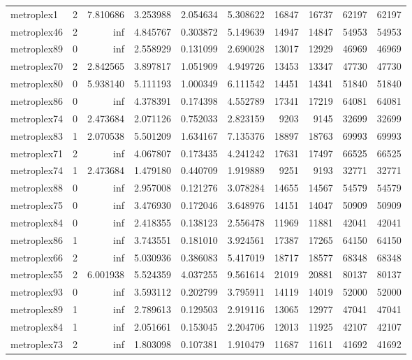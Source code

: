 \begin{longtable}{|l|r|r|r|r|r|r|r|r|r|}
metroplex1 & 2 & 7.810686 & 3.253988 & 2.054634 & 5.308622 & 16847 & 16737 & 62197 & 62197 \\
metroplex46 & 2 & inf & 4.845767 & 0.303872 & 5.149639 & 14947 & 14847 & 54953 & 54953 \\
metroplex89 & 0 & inf & 2.558929 & 0.131099 & 2.690028 & 13017 & 12929 & 46969 & 46969 \\
metroplex70 & 2 & 2.842565 & 3.897817 & 1.051909 & 4.949726 & 13453 & 13347 & 47730 & 47730 \\
metroplex80 & 0 & 5.938140 & 5.111193 & 1.000349 & 6.111542 & 14451 & 14341 & 51840 & 51840 \\
metroplex86 & 0 & inf & 4.378391 & 0.174398 & 4.552789 & 17341 & 17219 & 64081 & 64081 \\
metroplex74 & 0 & 2.473684 & 2.071126 & 0.752033 & 2.823159 & 9203 & 9145 & 32699 & 32699 \\
metroplex83 & 1 & 2.070538 & 5.501209 & 1.634167 & 7.135376 & 18897 & 18763 & 69993 & 69993 \\
metroplex71 & 2 & inf & 4.067807 & 0.173435 & 4.241242 & 17631 & 17497 & 66525 & 66525 \\
metroplex74 & 1 & 2.473684 & 1.479180 & 0.440709 & 1.919889 & 9251 & 9193 & 32771 & 32771 \\
metroplex88 & 0 & inf & 2.957008 & 0.121276 & 3.078284 & 14655 & 14567 & 54579 & 54579 \\
metroplex75 & 0 & inf & 3.476930 & 0.172046 & 3.648976 & 14151 & 14047 & 50909 & 50909 \\
metroplex84 & 0 & inf & 2.418355 & 0.138123 & 2.556478 & 11969 & 11881 & 42041 & 42041 \\
metroplex86 & 1 & inf & 3.743551 & 0.181010 & 3.924561 & 17387 & 17265 & 64150 & 64150 \\
metroplex66 & 2 & inf & 5.030936 & 0.386083 & 5.417019 & 18717 & 18577 & 68348 & 68348 \\
metroplex55 & 2 & 6.001938 & 5.524359 & 4.037255 & 9.561614 & 21019 & 20881 & 80137 & 80137 \\
metroplex93 & 0 & inf & 3.593112 & 0.202799 & 3.795911 & 14119 & 14019 & 52000 & 52000 \\
metroplex89 & 1 & inf & 2.789613 & 0.129503 & 2.919116 & 13065 & 12977 & 47041 & 47041 \\
metroplex84 & 1 & inf & 2.051661 & 0.153045 & 2.204706 & 12013 & 11925 & 42107 & 42107 \\
metroplex73 & 2 & inf & 1.803098 & 0.107381 & 1.910479 & 11687 & 11611 & 41692 & 41692 \\

\end{longtable}
